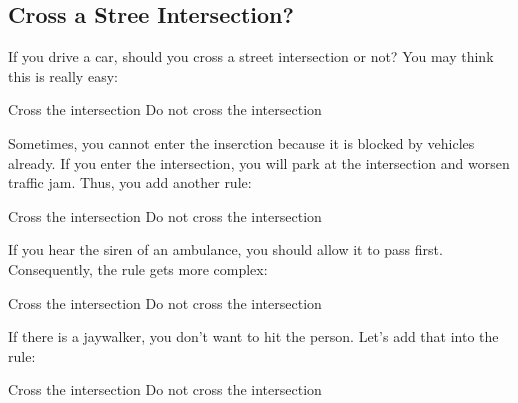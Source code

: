\subsection{Cross a Stree Intersection?}

If you drive a car, should you cross a street intersection or not?
You may think this is really easy:

\begin{algorithm}[H]
    \begin{algorithmic}[1]
      \State Cross the intersection
      \Else
      \State Do not cross the intersection
      \EndIf
    \end{algorithmic}
\end{algorithm}

Sometimes, you cannot enter the inserction because it is blocked
by vehicles already. If you enter the intersection, you will park
at the intersection and worsen traffic jam. Thus, you add another rule:

\begin{algorithm}[H]
    \begin{algorithmic}[1]
      \State Cross the intersection
      \Else
      \State Do not cross the intersection
      \EndIf
    \end{algorithmic}
\end{algorithm}

If you hear the siren of an ambulance, you should allow it to pass first.
Consequently, the rule gets more complex:

\begin{algorithm}[H]
    \begin{algorithmic}[1]
      \State Cross the intersection
      \Else
      \State Do not cross the intersection
      \EndIf
    \end{algorithmic}
\end{algorithm}

If there is a jaywalker, you don't want to hit the person. Let's add that into the rule:

\begin{algorithm}[H]
    \begin{algorithmic}[1]
      \State Cross the intersection
      \Else
      \State Do not cross the intersection
      \EndIf
    \end{algorithmic}
\end{algorithm}

